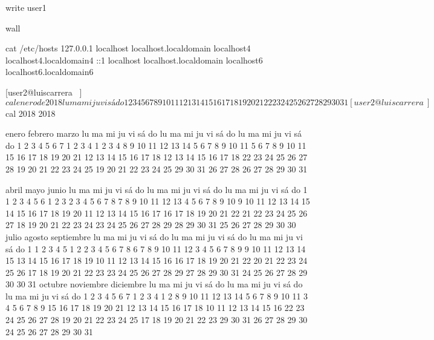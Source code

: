 \documentclass{memoir}
\begin{document}

write user1

wall

 cat /etc/hosts
127.0.0.1   localhost localhost.localdomain localhost4 localhost4.localdomain4
::1         localhost localhost.localdomain localhost6 localhost6.localdomain6

[user2@luiscarrera ~]$ cal
    enero de 2018
lu ma mi ju vi sá do
 1  2  3  4  5  6  7
 8  9 10 11 12 13 14
15 16 17 18 19 20 21
22 23 24 25 26 27 28
29 30 31

[user2@luiscarrera ~]$ cal 2018
                               2018

        enero                 febrero                 marzo
lu ma mi ju vi sá do   lu ma mi ju vi sá do   lu ma mi ju vi sá do
 1  2  3  4  5  6  7             1  2  3  4             1  2  3  4
 8  9 10 11 12 13 14    5  6  7  8  9 10 11    5  6  7  8  9 10 11
15 16 17 18 19 20 21   12 13 14 15 16 17 18   12 13 14 15 16 17 18
22 23 24 25 26 27 28   19 20 21 22 23 24 25   19 20 21 22 23 24 25
29 30 31               26 27 28               26 27 28 29 30 31

        abril                  mayo                   junio
lu ma mi ju vi sá do   lu ma mi ju vi sá do   lu ma mi ju vi sá do
                   1       1  2  3  4  5  6                1  2  3
 2  3  4  5  6  7  8    7  8  9 10 11 12 13    4  5  6  7  8  9 10
 9 10 11 12 13 14 15   14 15 16 17 18 19 20   11 12 13 14 15 16 17
16 17 18 19 20 21 22   21 22 23 24 25 26 27   18 19 20 21 22 23 24
23 24 25 26 27 28 29   28 29 30 31            25 26 27 28 29 30
30
        julio                 agosto               septiembre
lu ma mi ju vi sá do   lu ma mi ju vi sá do   lu ma mi ju vi sá do
                   1          1  2  3  4  5                   1  2
 2  3  4  5  6  7  8    6  7  8  9 10 11 12    3  4  5  6  7  8  9
 9 10 11 12 13 14 15   13 14 15 16 17 18 19   10 11 12 13 14 15 16
16 17 18 19 20 21 22   20 21 22 23 24 25 26   17 18 19 20 21 22 23
23 24 25 26 27 28 29   27 28 29 30 31         24 25 26 27 28 29 30
30 31
       octubre               noviembre              diciembre
lu ma mi ju vi sá do   lu ma mi ju vi sá do   lu ma mi ju vi sá do
 1  2  3  4  5  6  7             1  2  3  4                   1  2
 8  9 10 11 12 13 14    5  6  7  8  9 10 11    3  4  5  6  7  8  9
15 16 17 18 19 20 21   12 13 14 15 16 17 18   10 11 12 13 14 15 16
22 23 24 25 26 27 28   19 20 21 22 23 24 25   17 18 19 20 21 22 23
29 30 31               26 27 28 29 30         24 25 26 27 28 29 30
                                              31
\end{document}
